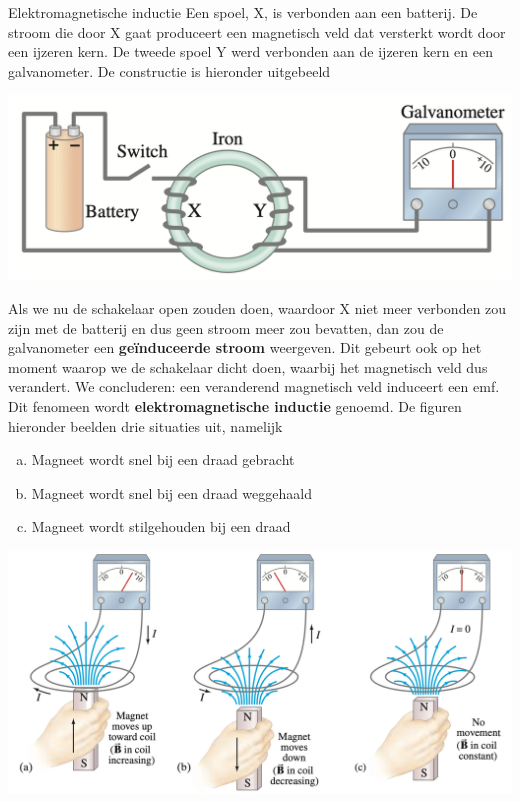 \begin{theo}{Elektromagnetische inductie}
    Een spoel, X, is verbonden aan een batterij. De stroom die door X gaat produceert een magnetisch veld dat versterkt
    wordt door een ijzeren kern. De tweede spoel Y werd verbonden aan de ijzeren kern en een galvanometer. De constructie is hieronder uitgebeeld
    
    \begin{center}
        \includegraphics[scale = 0.35]{Images/Magnetisme/MagnetischeInductieExperiment.png}
    \end{center}

    \noindent Als we nu de schakelaar open zouden doen, waardoor X niet meer verbonden zou zijn met de batterij en dus geen stroom meer zou bevatten, 
    dan zou de galvanometer een \textbf{geïnduceerde stroom} weergeven. Dit gebeurt ook op het moment waarop we de schakelaar dicht doen, waarbij het
    magnetisch veld dus verandert. We concluderen: een veranderend magnetisch veld induceert een emf. Dit fenomeen wordt \textbf{elektromagnetische inductie} genoemd. 
    De figuren hieronder beelden drie situaties uit, namelijk
    \begin{enumerate}[(a)]
        \item Magneet wordt snel bij een draad gebracht
        \item Magneet wordt snel bij een draad weggehaald
        \item Magneet wordt stilgehouden bij een draad
    \end{enumerate}

    \begin{center}
        \includegraphics[scale = 0.35]{Images/Magnetisme/MagnetischeInductieMagneet.png}
    \end{center}
    \vspace{-0.25cm}
\end{theo}

